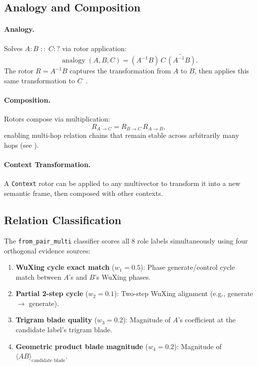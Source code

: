 \documentclass[11pt,a4paper]{article}
\newcommand{\grade}[1]{\langle #1 \rangle}
\newcommand{\rev}[1]{\widetilde{#1}}
\begin{document}
\subsection{Analogy and Composition}

\paragraph{Analogy.} Solves $A : B \; :: \; C : ?$ via rotor application:
\begin{equation}
  \operatorname{analogy}(A, B, C) = (A^{-1} B)\, C\, \rev{(A^{-1} B)}.
\end{equation}
The rotor $R = A^{-1} B$ captures the transformation from $A$ to $B$, then
applies this same transformation to $C$~\cite{doran2003geometric}.

\paragraph{Composition.} Rotors compose via multiplication:
\begin{equation}
  R_{A \to C} = R_{B \to C}\,R_{A \to B},
\end{equation}
enabling multi-hop relation chains that remain stable across arbitrarily many
hops (see ).

\paragraph{Context Transformation.} A \texttt{Context} rotor can be applied to
any multivector to transform it into a new semantic frame, then composed with
other contexts.

\subsection{Relation Classification}

The \texttt{from\_pair\_multi} classifier scores all 8 role labels
simultaneously using four orthogonal evidence sources:

\begin{enumerate}[nosep]
\item \textbf{WuXing cycle exact match} ($w_1 = 0.5$): Phase generate/control
  cycle match between $A$'s and $B$'s WuXing phases.
\item \textbf{Partial 2-step cycle} ($w_2 = 0.1$): Two-step WuXing alignment
  (e.g., generate $\to$ generate).
\item \textbf{Trigram blade quality} ($w_3 = 0.2$): Magnitude of $A$'s
  coefficient at the candidate label's trigram blade.
\item \textbf{Geometric product blade magnitude} ($w_4 = 0.2$): Magnitude of
  $\grade{AB}_{\text{candidate blade}}$.
\end{enumerate}
\end{document}
